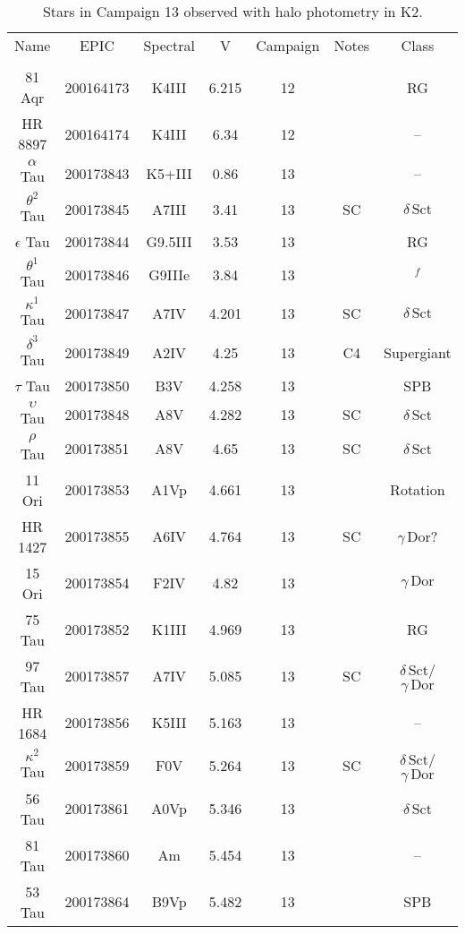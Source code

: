 \begin{table*}
\caption{Stars in Campaign 13 observed with halo photometry in K2.\label{table_3}}
\begin{tabular}{ccccccc}
\hline \hline
Name & EPIC & Spectral & V & Campaign & Notes & Class \\
 &  &  &  &  &  &  \\
\hline
81 Aqr & 200164173 & K4III & 6.215 & 12 &  & RG \\
HR 8897 & 200164174 & K4III & 6.34 & 12 &  & -- \\
$\alpha$ Tau & 200173843 & K5+III & 0.86 & 13 & \tablenotemark{c} & -- \\
$\theta^{2}$ Tau & 200173845 & A7III & 3.41 & 13 & SC & $\delta\,\text{Sct}$ \\
$\epsilon$ Tau & 200173844 & G9.5III & 3.53 & 13 & \tablenotemark{d} & RG \\
$\theta^{1}$ Tau & 200173846 & G9IIIe & 3.84 & 13 &  & $^f$ \\
$\kappa^{1}$ Tau & 200173847 & A7IV & 4.201 & 13 & SC & $\delta\,\text{Sct}$ \\
$\delta^{3}$ Tau & 200173849 & A2IV & 4.25 & 13 & C4 & Supergiant \\
$\tau$ Tau & 200173850 & B3V & 4.258 & 13 &  & SPB \\
$\upsilon$ Tau & 200173848 & A8V & 4.282 & 13 & SC & $\delta\,\text{Sct}$ \\
$\rho$ Tau & 200173851 & A8V & 4.65 & 13 & SC & $\delta\,\text{Sct}$ \\
11 Ori & 200173853 & A1Vp & 4.661 & 13 &  & Rotation \\
HR 1427 & 200173855 & A6IV & 4.764 & 13 & SC & $\gamma\,\text{Dor}$? \\
15 Ori & 200173854 & F2IV & 4.82 & 13 &  & $\gamma\,\text{Dor}$ \\
75 Tau & 200173852 & K1III & 4.969 & 13 &  & RG \\
97 Tau & 200173857 & A7IV & 5.085 & 13 & SC & $\delta\,\text{Sct}$/$\gamma\,\text{Dor}$ \\
HR 1684 & 200173856 & K5III & 5.163 & 13 &  & -- \\
$\kappa^{2}$ Tau & 200173859 & F0V & 5.264 & 13 & SC & $\delta\,\text{Sct}$/$\gamma\,\text{Dor}$ \\
56 Tau & 200173861 & A0Vp & 5.346 & 13 &  & $\delta\,\text{Sct}$ \\
81 Tau & 200173860 & Am & 5.454 & 13 &  & -- \\
53 Tau & 200173864 & B9Vp & 5.482 & 13 &  & SPB \\

\end{tabular}
\end{table*}
